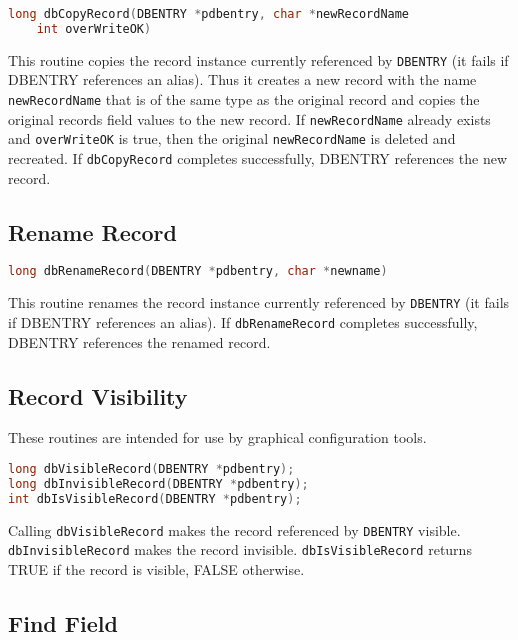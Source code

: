\begin{lstlisting}[language=C]
long dbCopyRecord(DBENTRY *pdbentry, char *newRecordName
    int overWriteOK)
\end{lstlisting}

This routine copies the record instance currently referenced by \verb|DBENTRY| (it fails if DBENTRY references an alias).
Thus it creates a new record with the name \verb|newRecordName| that is of the same type as the original record and copies the original records field values to the new record.
If \verb|newRecordName| already exists and \verb|overWriteOK| is true, then the original \verb|newRecordName| is deleted and recreated.
If \verb|dbCopyRecord| completes successfully, DBENTRY references the new record.

\subsection{Rename Record}

\begin{lstlisting}[language=C]
long dbRenameRecord(DBENTRY *pdbentry, char *newname)
\end{lstlisting}

This routine renames the record instance currently referenced by \verb|DBENTRY| (it fails if DBENTRY references an alias).
If \verb|dbRenameRecord| completes successfully, DBENTRY references the renamed record.

\subsection{Record Visibility}

These routines are intended for use by graphical configuration tools.

\begin{lstlisting}[language=C]
long dbVisibleRecord(DBENTRY *pdbentry);
long dbInvisibleRecord(DBENTRY *pdbentry);
int dbIsVisibleRecord(DBENTRY *pdbentry);
\end{lstlisting}

Calling \verb|dbVisibleRecord| makes the record referenced by \verb|DBENTRY| visible.
\verb|dbInvisibleRecord| makes the record invisible.
\verb|dbIsVisibleRecord| returns TRUE if the record is visible, FALSE otherwise.

\subsection{Find Field}

